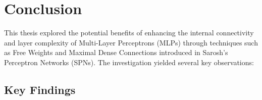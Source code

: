 
\chapter{Conclusion} %

\label{Conclusion} %

This thesis explored the potential benefits of enhancing the internal connectivity and layer complexity of Multi-Layer Perceptrons (MLPs) through techniques such as Free Weights and Maximal Dense Connections introduced in Sarosh’s Perceptron Networks (SPNs). The investigation yielded several key observations:


\section{Key Findings}

